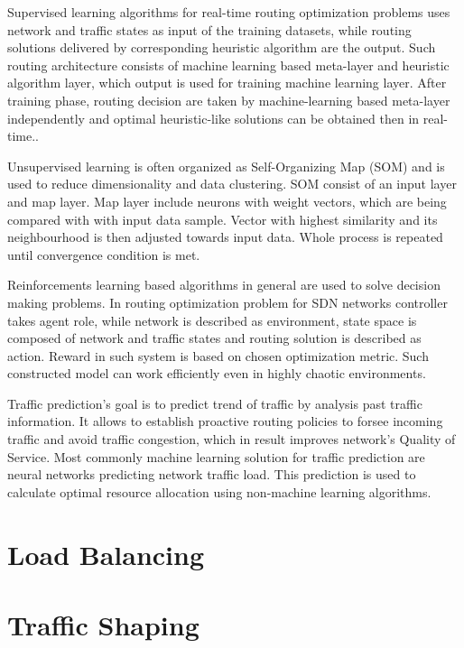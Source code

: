 \documentclass[conference]{IEEEtran}
\begin{document}
Supervised learning algorithms for real-time routing optimization problems uses network and traffic states as input of the training datasets, while routing solutions delivered by corresponding heuristic algorithm are the output. Such routing architecture consists of machine learning based meta-layer and heuristic algorithm layer, which output is used for training machine learning layer. After training phase, routing decision are taken by machine-learning based meta-layer independently and optimal heuristic-like solutions can be obtained then in real-time.\cite{routing3}. \par \newpage
Unsupervised learning is often organized as Self-Organizing Map (SOM) and is used to reduce dimensionality and data clustering. SOM consist of an input layer and map layer. Map layer include neurons with weight vectors, which are being compared with with input data sample. Vector with highest similarity and its neighbourhood is then adjusted towards input data. Whole process is repeated until convergence condition is met\cite{routing3}. \par
Reinforcements learning based algorithms in general are used to solve decision making problems. In routing optimization problem for SDN networks controller takes agent role, while network is described as environment, state space is composed of network and traffic states and routing solution is described as action. Reward in such system is based on chosen optimization metric. Such constructed model can work efficiently even in highly chaotic environments\cite{routing3}. \par
Traffic prediction's goal is to predict trend of traffic by analysis past traffic information. It allows to establish proactive routing policies to forsee incoming traffic and avoid traffic congestion, which in result improves network's Quality of Service. Most commonly machine learning solution for traffic prediction are neural networks predicting network traffic load. This prediction is used to calculate optimal resource allocation using non-machine learning algorithms\cite{routing3}.

\section{Load Balancing}

\section{Traffic Shaping}
\end{document}
